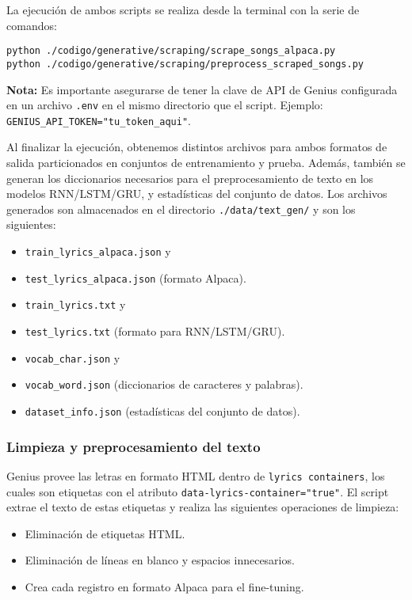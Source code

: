 \documentclass[paper=letter, fontsize=11pt, draft=false]{scrartcl}
\numberwithin{equation}{section} %
\numberwithin{figure}{section} %
\numberwithin{table}{section} %
\numberwithin{subsection}{section}
\begin{document}
La ejecución de ambos scripts se realiza desde la terminal con la serie de comandos:

\begin{center}
\texttt{python ./codigo/generative/scraping/scrape\_songs\_alpaca.py} \\
\texttt{python ./codigo/generative/scraping/preprocess\_scraped\_songs.py}
\end{center}

\textbf{Nota:} Es importante asegurarse de tener la clave de API de Genius configurada en un archivo \texttt{.env} en el mismo directorio que el script. Ejemplo: \texttt{GENIUS\_API\_TOKEN="tu\_token\_aqui"}.

Al finalizar la ejecución, obtenemos distintos archivos para ambos formatos de salida particionados en conjuntos de entrenamiento y prueba. Además, también se generan los diccionarios necesarios para el preprocesamiento de texto en los modelos RNN/LSTM/GRU, y estadísticas del conjunto de datos. Los archivos generados son almacenados en el directorio \texttt{./data/text\_gen/} y son los siguientes:
\begin{itemize}
    \item \texttt{train\_lyrics\_alpaca.json} y
    \item  \texttt{test\_lyrics\_alpaca.json} (formato Alpaca).
    \item \texttt{train\_lyrics.txt} y
    \item \texttt{test\_lyrics.txt} (formato para RNN/LSTM/GRU).
    \item \texttt{vocab\_char.json} y
    \item \texttt{vocab\_word.json} (diccionarios de caracteres y palabras).
    \item \texttt{dataset\_info.json} (estadísticas del conjunto de datos).
\end{itemize}



\subsubsection{Limpieza y preprocesamiento del texto}

Genius provee las letras en formato HTML dentro de \texttt{lyrics containers}, los cuales son etiquetas con el atributo \texttt{data-lyrics-container="true"}. El script extrae el texto de estas etiquetas y realiza las siguientes operaciones de limpieza:

\begin{itemize}
    \item Eliminación de etiquetas HTML.
    \item Eliminación de líneas en blanco y espacios innecesarios.
    \item Crea cada registro en formato Alpaca para el fine-tuning.
\end{itemize}
\end{document}
